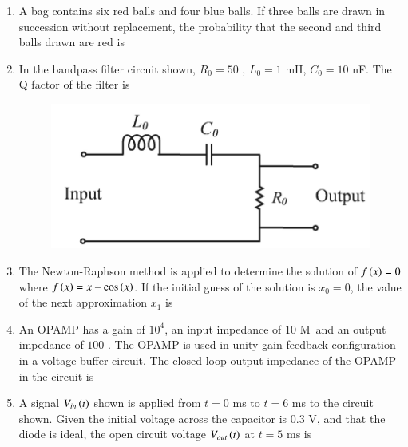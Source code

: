 \documentclass[journal,12pt,onecolumn]{IEEEtran}
\theoremstyle{remark}
\begin{document}
\begin{enumerate}
\item A bag contains six red balls and four blue balls. If three balls are drawn in succession without replacement, the probability that the second and third balls drawn are red is \underline{\hspace{2cm}} 

\hfill{}

\item In the bandpass filter circuit shown, $R_0 = 50$ \ohm, $L_0 = 1$ mH, $C_0 = 10$ nF. The Q factor of the filter is \underline{\hspace{2cm}} 

\hfill{}
\begin{figure}[H]
\includegraphics[width = 0.6\columnwidth]{q33}
\caption*{}
\label{q33}
\end{figure}

\item The Newton-Raphson method is applied to determine the solution of $f\left(x\right) = 0$ where $f\left(x\right) = x - \cos \left(x\right)$. If the initial guess of the solution is $x_0 = 0$, the value of the next approximation $x_1$ is \underline{\hspace{2cm}} 

\hfill{}

\item An OPAMP has a gain of $10^4$, an input impedance of $10$ M\ohm \ and an output impedance of $100$ \ohm. The OPAMP is used in unity-gain feedback configuration in a voltage buffer circuit. The closed-loop output impedance of the OPAMP  in the circuit is \underline{\hspace{2cm}} 

\hfill{}

\item A signal $V_{in}\left(t\right)$ shown is applied from $t = 0$ ms to $t = 6$ ms to the circuit shown. Given the initial voltage across the capacitor is $0.3$ V, and that the diode is ideal, the open circuit voltage $V_{out}\left(t\right)$ at $t = 5$ ms is \underline{\hspace{2cm}}


\end{enumerate}
\end{document}
